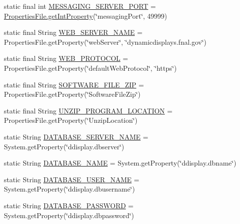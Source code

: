 \begin{DoxyCompactItemize}
\item 
static final int \hyperlink{classgov_1_1fnal_1_1ppd_1_1dd_1_1GlobalVariables_a3afb8f4fd1dbbc82329ea9ff4aa3629e}{M\-E\-S\-S\-A\-G\-I\-N\-G\-\_\-\-S\-E\-R\-V\-E\-R\-\_\-\-P\-O\-R\-T} = \hyperlink{classgov_1_1fnal_1_1ppd_1_1dd_1_1util_1_1nonguiUtils_1_1PropertiesFile_a5ed1fc6f67450475cdff0256ca4d6aad}{Properties\-File.\-get\-Int\-Property}(\char`\"{}messaging\-Port\char`\"{}, 49999)
\item 
static final String \hyperlink{classgov_1_1fnal_1_1ppd_1_1dd_1_1GlobalVariables_af5ffb15826513fabba402ec017edbc70}{W\-E\-B\-\_\-\-S\-E\-R\-V\-E\-R\-\_\-\-N\-A\-M\-E} = Properties\-File.\-get\-Property(\char`\"{}web\-Server\char`\"{}, \char`\"{}dynamicdisplays.\-fnal.\-gov\char`\"{})
\item 
static final String \hyperlink{classgov_1_1fnal_1_1ppd_1_1dd_1_1GlobalVariables_aa3bf05d555f0c3489c60664ae54a2480}{W\-E\-B\-\_\-\-P\-R\-O\-T\-O\-C\-O\-L} = Properties\-File.\-get\-Property(\char`\"{}default\-Web\-Protocol\char`\"{}, \char`\"{}https\char`\"{})
\item 
static final String \hyperlink{classgov_1_1fnal_1_1ppd_1_1dd_1_1GlobalVariables_ab8e56e6480b2c30248d2e20aee782cb4}{S\-O\-F\-T\-W\-A\-R\-E\-\_\-\-F\-I\-L\-E\-\_\-\-Z\-I\-P} = Properties\-File.\-get\-Property(\char`\"{}Software\-File\-Zip\char`\"{})
\item 
static final String \hyperlink{classgov_1_1fnal_1_1ppd_1_1dd_1_1GlobalVariables_a3b3484a9eaa4099af2a1ade1fa0f94a5}{U\-N\-Z\-I\-P\-\_\-\-P\-R\-O\-G\-R\-A\-M\-\_\-\-L\-O\-C\-A\-T\-I\-O\-N} = Properties\-File.\-get\-Property(\char`\"{}Unzip\-Location\char`\"{})
\item 
static String \hyperlink{classgov_1_1fnal_1_1ppd_1_1dd_1_1GlobalVariables_a84bb07dcee9c961579282f50a5031c0e}{D\-A\-T\-A\-B\-A\-S\-E\-\_\-\-S\-E\-R\-V\-E\-R\-\_\-\-N\-A\-M\-E} = System.\-get\-Property(\char`\"{}ddisplay.\-dbserver\char`\"{})
\item 
static String \hyperlink{classgov_1_1fnal_1_1ppd_1_1dd_1_1GlobalVariables_a737045676a15c469e5cb486d80c08043}{D\-A\-T\-A\-B\-A\-S\-E\-\_\-\-N\-A\-M\-E} = System.\-get\-Property(\char`\"{}ddisplay.\-dbname\char`\"{})
\item 
static String \hyperlink{classgov_1_1fnal_1_1ppd_1_1dd_1_1GlobalVariables_a1b5c1519d1964bf42b3fe4908ae6d444}{D\-A\-T\-A\-B\-A\-S\-E\-\_\-\-U\-S\-E\-R\-\_\-\-N\-A\-M\-E} = System.\-get\-Property(\char`\"{}ddisplay.\-dbusername\char`\"{})
\item 
static String \hyperlink{classgov_1_1fnal_1_1ppd_1_1dd_1_1GlobalVariables_ae63bd973c9c02683b0c4964179ceefe0}{D\-A\-T\-A\-B\-A\-S\-E\-\_\-\-P\-A\-S\-S\-W\-O\-R\-D} = System.\-get\-Property(\char`\"{}ddisplay.\-dbpassword\char`\"{})

\end{DoxyCompactItemize}
